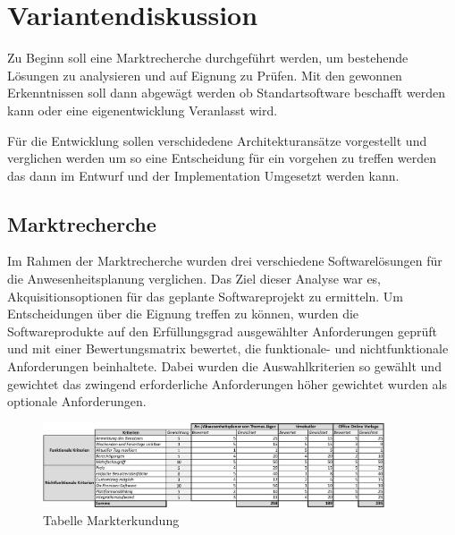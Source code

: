 \section{Variantendiskussion}
\label{sec:Variantendiskussion}
Zu Beginn soll eine Marktrecherche durchgeführt werden, um bestehende Lösungen zu analysieren und auf Eignung zu Prüfen. Mit den gewonnen Erkenntnissen soll dann abgewägt werden ob Standartsoftware beschafft werden kann oder eine eigenentwicklung Veranlasst wird.

Für die Entwicklung sollen verschidedene Architekturansätze vorgestellt und verglichen werden um so eine Entscheidung für ein vorgehen zu treffen werden das dann im Entwurf und der Implementation Umgesetzt werden kann.

\subsection{Marktrecherche}
\label{sec:Marktrecherche}
Im Rahmen der Marktrecherche wurden drei verschiedene Softwarelösungen für die Anwesenheitsplanung verglichen. Das Ziel dieser Analyse war es, Akquisitionsoptionen für das geplante Softwareprojekt zu ermitteln. Um Entscheidungen über die Eignung treffen zu können, wurden die Softwareprodukte auf den Erfüllungsgrad ausgewählter Anforderungen geprüft und mit einer Bewertungsmatrix bewertet, die funktionale- und nichtfunktionale Anforderungen beinhaltete. Dabei wurden die Auswahlkriterien so gewählt und gewichtet das zwingend erforderliche Anforderungen höher gewichtet wurden als optionale Anforderungen.

\begin{figure}[htb]
    \centering
    \includegraphics[width=0.9\textwidth,angle=0]{abb/Markterkundung.pdf}
    \caption[Beschreibung]{ Tabelle Markterkundung}
    \label{tab:Markterkundung}
\end{figure}

